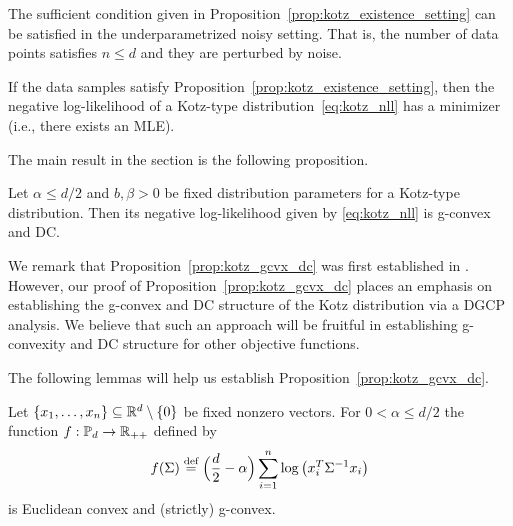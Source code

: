 \documentclass[sn-nature]{sn-jnl}%
\theoremstyle{thmstyleone}%
\theoremstyle{thmstyletwo}%
\theoremstyle{thmstylethree}%
\begin{document}
The sufficient condition given in Proposition~\ref{prop:kotz_existence_setting} can be satisfied in the underparametrized noisy setting. That is, the number of data points satisfies $n \leq d$ and they are perturbed by noise.

\begin{theorem}
     If the data samples satisfy Proposition~\ref{prop:kotz_existence_setting}, then the negative log-likelihood of a Kotz-type distribution~\eqref{eq:kotz_nll} has a minimizer (i.e., there exists an MLE).
\end{theorem}



The main result in the section is the following proposition.

\begin{prop}\label{prop:kotz_gcvx_dc}
    Let $\alpha \leq d/2$ and $b, \beta >0$ be fixed distribution parameters for a Kotz-type distribution. Then its negative log-likelihood given by \eqref{eq:kotz_nll} is g-convex and DC. 
\end{prop}

We remark that Proposition~\ref{prop:kotz_gcvx_dc} was first established in \cite{Sra_conic_geometric_Opt_SPD}. However, our proof of Proposition~\ref{prop:kotz_gcvx_dc} places an emphasis on establishing the g-convex and DC structure of the Kotz distribution via a DGCP analysis. We believe that such an approach will be fruitful in establishing g-convexity and DC structure for other objective functions.







The following lemmas will help us establish Proposition~\ref{prop:kotz_gcvx_dc}.

\begin{lemma}\label{lemma:log_matrix_frac_gcvx}
    Let $\{x_1, \ldots, x_n\}\subseteq \mathbb{R}^d \setminus \{0\}$ be fixed nonzero vectors.
    For $0 < \alpha \leq d/2$ the function $f:\mathbb{P}_d \to \mathbb{R}_{++}$ defined by 
    \[
    f(\Sigma) \stackrel{\text{def}}{=} \Big(\frac{d}{2}-\alpha\Big) \sum_{i=1}^n \log \left(x_i^T \Sigma^{-1} x_i\right)
    \]
    is Euclidean convex and (strictly) g-convex.
\end{lemma}
\end{document}
